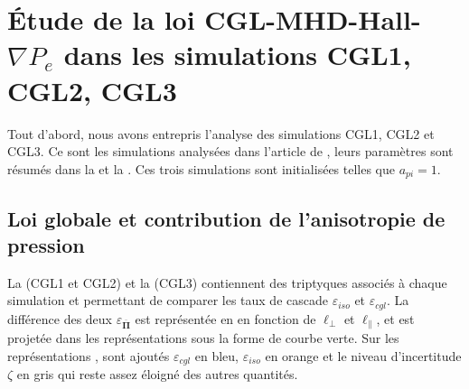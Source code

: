  \section{Étude de la loi CGL-MHD-Hall-\ensuremath{\nabla P_e} dans les simulations CGL1, CGL2, CGL3}
 \label{sec-332} 
 
 Tout d'abord, nous avons entrepris l'analyse des simulations CGL1, CGL2 et CGL3.
 Ce sont les simulations  analysées dans l'article de \cite{ferrand_fluid_2021}, leurs paramètres sont résumés dans la  et la . Ces trois simulations sont initialisées telles que $a_{pi} = 1$. 
 
 \subsection{Loi globale et contribution de l'anisotropie de pression}
 La  (CGL1 et CGL2) et la  (CGL3) contiennent des triptyques associés à chaque simulation et permettant de comparer les taux de cascade $\varepsilon_{iso} $ et  $\varepsilon_{cgl}$. La différence des deux $\varepsilon_{\overline{\boldsymbol{\Pi}}} $ est représentée en  en fonction de $\ell_{\perp}$ et $\ell_{\parallel}$, et est projetée dans les représentations  sous la forme de courbe verte. Sur les représentations , sont ajoutés $\varepsilon_{cgl}$ en bleu, $\varepsilon_{iso}$ en orange et le niveau d'incertitude $\zeta$ en gris qui reste assez éloigné des autres quantités.
 
